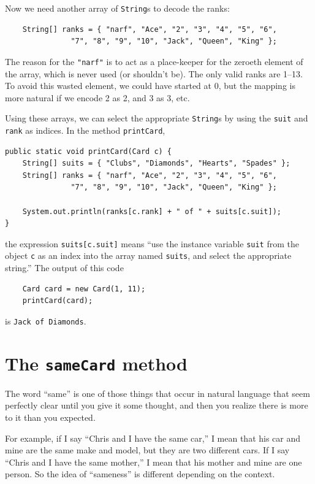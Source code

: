 \documentclass[12pt]{book}
\theoremstyle{exercise}
\begin{document}
Now we need another array of {\tt String}s to decode the ranks:

\begin{lstlisting}
    String[] ranks = { "narf", "Ace", "2", "3", "4", "5", "6",
               "7", "8", "9", "10", "Jack", "Queen", "King" };
\end{lstlisting}
%
The reason for the {\tt "narf"} is to act as a place-keeper for the
zeroeth element of the array, which is never used (or shouldn't be).
The only valid ranks are 1--13.  To avoid this wasted element,
we could have started at 0, but the mapping is more natural if we
encode 2 as 2, and 3 as 3, etc.

Using these arrays, we can select the appropriate {\tt String}s by
using the {\tt suit} and {\tt rank} as indices.  In the method
{\tt printCard},

\begin{lstlisting}
public static void printCard(Card c) {
    String[] suits = { "Clubs", "Diamonds", "Hearts", "Spades" };
    String[] ranks = { "narf", "Ace", "2", "3", "4", "5", "6",
               "7", "8", "9", "10", "Jack", "Queen", "King" };

    System.out.println(ranks[c.rank] + " of " + suits[c.suit]);
}
\end{lstlisting}

the expression {\tt suits[c.suit]} means ``use the instance variable
{\tt suit} from the object {\tt c} as an index into the array named
{\tt suits}, and select the appropriate string.''  The output of this
code

\begin{lstlisting}
    Card card = new Card(1, 11);
    printCard(card);
\end{lstlisting}
%
is {\tt Jack of Diamonds}.


\section{The {\tt sameCard} method}
\label{equivalence}

The word ``same'' is one of those things that occur in natural
language that seem perfectly clear until you give it some thought,
and then you realize there is more to it than you expected.

For example, if I say ``Chris and I have the same car,'' I
mean that his car and mine are the same make and model, but they are
two different cars.  If I say ``Chris and I have the same mother,'' I
mean that his mother and mine are one person.  So the
idea of ``sameness'' is different depending on the context.
\end{document}
